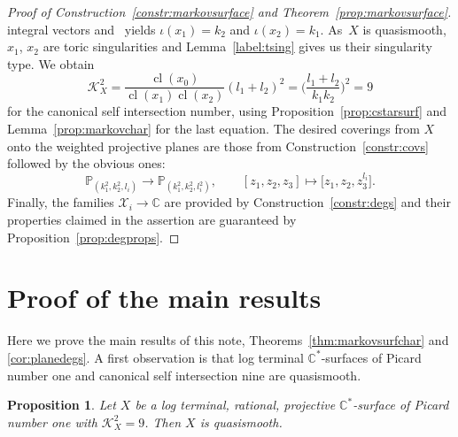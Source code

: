 \documentclass[10pt,a4paper]{amsart}
\newtheorem{prop}[thm]{Proposition}
\theoremstyle{definition}
\def\CC{{\mathbb C}}
\def\PP{{\mathbb P}}
\DeclareMathOperator{\cl}{cl}
\begin{document}
\begin{proof}[Proof of Construction~\ref{constr:markovsurface}
and Theorem~\ref{prop:markovsurface}]
integral vectors and~\cite[Proposition~8.9]{HaHaSp} yields
$\iota(x_1)=k_2$ and $\iota(x_2)=k_1$.
As~$X$ is quasismooth, $x_1$, $x_2$ are toric
singularities and Lemma~\ref{label:tsing}
gives us their singularity type.
We obtain
\[
\mathcal{K}_X^2
 =
\frac{\cl(x_0)}{\cl(x_1)\cl(x_2)} (l_1+l_2)^2
 =
\biggl(\frac{l_1+l_2}{k_1k_2}\biggr)^2
 =
9
\]
for the canonical self intersection number,
using Proposition~\ref{prop:cstarsurf} and
Lemma~\ref{prop:markovchar} for the last equation.
The desired coverings from $X$ onto the
weighted projective planes are those from
Construction~\ref{constr:covs} followed by the
obvious ones:
\[
\PP_{(k_1^2,k_2^2,l_i)} \to \PP_{(k_1^2,k_2^2,l_i^2)},
\qquad
[z_1,z_2,z_3] \mapsto \bigl[z_1,z_2,z_3^{l_i}\bigr].
\]
Finally, the families $\mathcal{X}_i \to \CC$
are provided by Construction~\ref{constr:degs}
and their properties claimed in the assertion
are guaranteed by
Proposition~\ref{prop:degprops}.
\end{proof}









\section{Proof of the main results}

Here we prove the main results of this note,
Theorems~\ref{thm:markovsurfchar} and \ref{cor:planedegs}.
A first observation is that log terminal $\CC^*$-surfaces
of Picard number one and canonical self intersection nine
are quasismooth.


\begin{prop}
\label{prop:notqs}
Let $X$ be a log terminal, rational, projective
$\CC^*$-surface of Picard number one with
$\mathcal{K}_X^2 = 9$. Then $X$ is quasismooth.
\end{prop}
\end{document}
